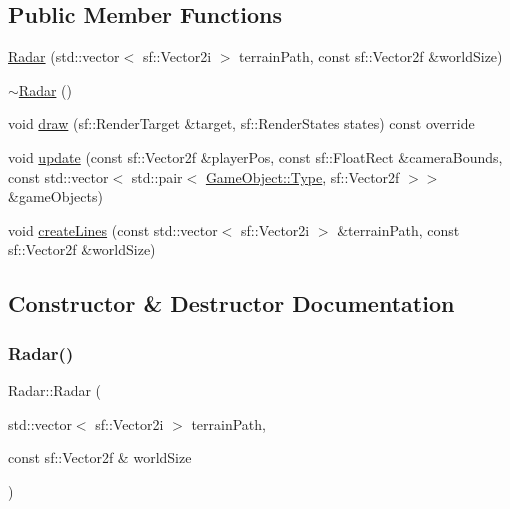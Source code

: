 \subsection*{Public Member Functions}
\begin{DoxyCompactItemize}
\item 
\hyperlink{class_radar_ab66bd1efe169882f4604ea10fe351330}{Radar} (std\+::vector$<$ sf\+::\+Vector2i $>$ terrain\+Path, const sf\+::\+Vector2f \&world\+Size)
\item 
\hyperlink{class_radar_a1989b108bc8d5b5e331c97241e622aa4}{$\sim$\+Radar} ()
\item 
void \hyperlink{class_radar_a89658480ff0e15b096097f8b7965893b}{draw} (sf\+::\+Render\+Target \&target, sf\+::\+Render\+States states) const override
\item 
void \hyperlink{class_radar_adc8e7611cbff8077fe6d9a871da49bea}{update} (const sf\+::\+Vector2f \&player\+Pos, const sf\+::\+Float\+Rect \&camera\+Bounds, const std\+::vector$<$ std\+::pair$<$ \hyperlink{class_game_object_a4bf9e8f660e6a49f1b802c2aa9dd95af}{Game\+Object\+::\+Type}, sf\+::\+Vector2f $>$$>$ \&game\+Objects)
\item 
void \hyperlink{class_radar_a1503fd82214f512677a7304abf288344}{create\+Lines} (const std\+::vector$<$ sf\+::\+Vector2i $>$ \&terrain\+Path, const sf\+::\+Vector2f \&world\+Size)
\end{DoxyCompactItemize}


\subsection{Constructor \& Destructor Documentation}
\mbox{\label{class_radar_ab66bd1efe169882f4604ea10fe351330}} 
\subsubsection{\texorpdfstring{Radar()}{Radar()}}
{\footnotesize\ttfamily Radar\+::\+Radar (\begin{DoxyParamCaption}\item[{std\+::vector$<$ sf\+::\+Vector2i $>$}]{terrain\+Path,  }\item[{const sf\+::\+Vector2f \&}]{world\+Size }\end{DoxyParamCaption})}

